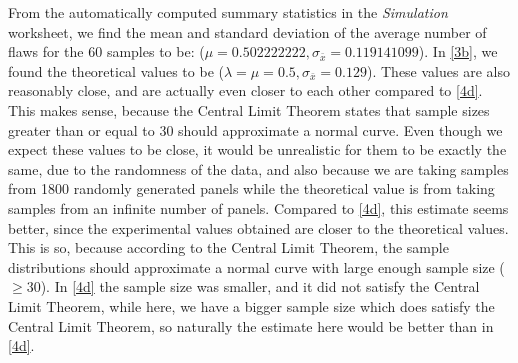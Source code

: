 \documentclass[letterpaper]{article}
\begin{document}
From the automatically computed summary statistics in the \textit{Simulation}
worksheet, we find the mean and standard deviation of the average number of
flaws for the 60 samples to be: ($\mu=0.502222222,
 \sigma_{\bar{x}}=0.119141099$). In \ref{3b}, we found the theoretical values to
be ($\lambda=\mu=0.5, \sigma_{\bar{x}}=0.129$). These values are also reasonably
close, and are actually even closer to each other compared to \ref{4d}. This
makes sense, because the Central Limit Theorem states that sample sizes greater
than  or equal to 30 should approximate a normal curve. Even though we expect
these values to be close, it would be unrealistic for them to be exactly the
same, due to the randomness of the data, and also because we are taking samples
from 1800 randomly generated panels while the theoretical value is from taking
samples from an infinite number of panels. Compared to \ref{4d}, this estimate
seems better, since the experimental values obtained are closer to the
theoretical values.  This is so, because according to the Central Limit Theorem,
the sample distributions should approximate a normal curve with large enough
sample size ($\geq30$). In \ref{4d} the sample size was smaller, and it did not
satisfy the Central Limit Theorem, while here, we have a bigger sample size
which does satisfy the Central Limit Theorem, so naturally the estimate here
would be better than in \ref{4d}.
\end{document}
